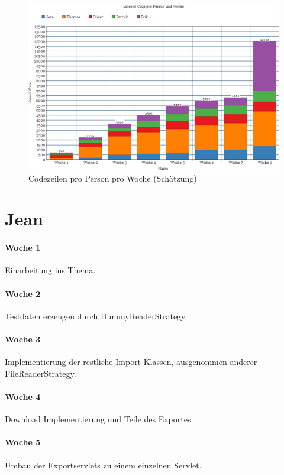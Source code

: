 \newpage
\begin{figure}[!htp]
	\includegraphics[height=0.97\linewidth,angle=270]{images/loc}
	\caption{Codezeilen pro Person pro Woche (Schätzung)}
\end{figure}
\newpage
\section{Jean}
\paragraph{Woche 1}
Einarbeitung ins Thema.
\paragraph{Woche 2}
Testdaten erzeugen durch DummyReaderStrategy.
\paragraph{Woche 3}
Implementierung der restliche Import-Klassen, ausgenommen anderer FileReaderStrategy.
\paragraph{Woche 4}
Download Implementierung und Teile des Exportes.
\paragraph{Woche 5}
Umbau der Exportservlets zu einem einzelnen Servlet.
